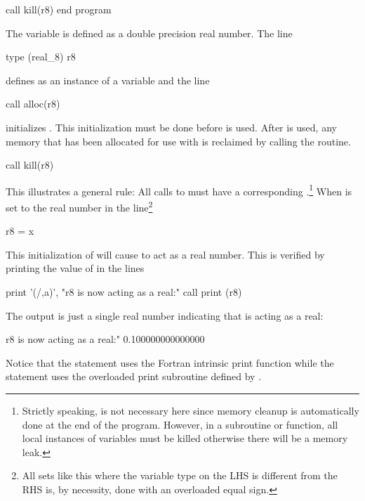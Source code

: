 \documentclass{hitec}     %
\begin{document}
{{{{{{{{{\begin{code}
call kill(r8)
end program
\end{code}
The variable  is defined as a double precision real number. The line
\begin{code}
type (real_8) r8
\end{code}
defines  as an instance of a  variable and the line
\begin{code}
call alloc(r8)
\end{code}
initializes . This initialization must be done before  is used. After  is used,
any memory that has been allocated for use with  is reclaimed by calling the 
routine.
\begin{code}
call kill(r8)
\end{code}
This illustrates a general rule: All calls to  must have a corresponding .\footnote
  { 
Strictly speaking,  is not necessary here since memory cleanup is automatically done at the end
of the program. However, in a subroutine or function, all local instances of  variables
must be killed otherwise there will be a memory leak.
  }
When  is set to the real number  in the line\footnote
  {
All sets like this where the variable type on the LHS is different from the RHS is, by necessity, done
with an overloaded equal sign.
  }
\begin{code}
  r8 = x
\end{code}
This initialization of 
will cause  to act as a real number. This is verified by printing the value of  in the lines
\begin{code}
print '(/,a)', "r8 is now acting as a real:"
call print (r8)
\end{code}
The output is just a single real number indicating that  is acting as a real:
\begin{code}
r8 is now acting as a real:"
0.100000000000000
\end{code}
Notice that the  statement uses the Fortran intrinsic print function while the  statement uses the overloaded print subroutine defined by .

}}}}}}}}}
\end{document}
